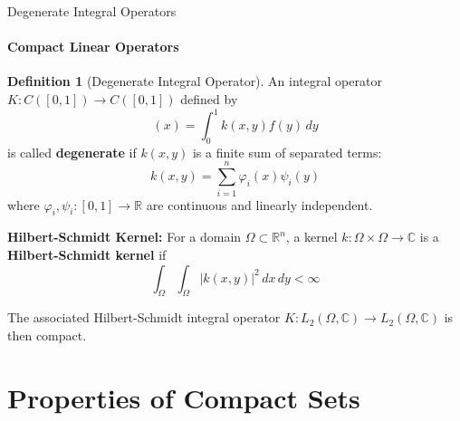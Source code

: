 \documentclass[aspectratio=169,10pt]{beamer}
\theoremstyle{definition}
\newtheorem{defn}{Definition}
\begin{document}
\begin{frame}[fragile]{Degenerate Integral Operators}
\framesubtitle{Compact Linear Operators}

\begin{defn}[Degenerate Integral Operator]
An integral operator $K: C([0,1]) \to C([0,1])$ defined by
\begin{equation*}
[Kf](x) = \int_0^1 k(x,y) f(y) \, dy
\end{equation*}
is called \textbf{degenerate} if $k(x,y)$ is a finite sum of separated terms:
\begin{equation*}
k(x,y) = \sum_{i=1}^n \varphi_i(x) \psi_i(y)
\end{equation*}
where $\varphi_i, \psi_i : [0,1] \to \mathbb{R}$ are continuous and linearly independent.
\end{defn}

\vspace{0.3cm}

\textbf{Hilbert-Schmidt Kernel:}
For a domain $\Omega \subset \mathbb{R}^n$, a kernel $k: \Omega \times \Omega \to \mathbb{C}$ is a \textbf{Hilbert-Schmidt kernel} if
\begin{equation*}
\int_{\Omega} \int_{\Omega} |k(x,y)|^2 \, dx \, dy < \infty
\end{equation*}

The associated Hilbert-Schmidt integral operator $K: L_2(\Omega, \mathbb{C}) \to L_2(\Omega, \mathbb{C})$ is then compact.
\end{frame}

\section{Properties of Compact Sets}
\end{document}
